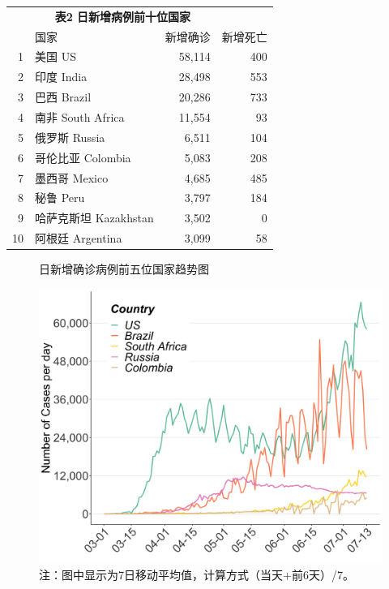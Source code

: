 \documentclass[]{article}
\begin{document}
\begin{table}[H]
    \centering \begin{table}[H]
\centering\begingroup\fontsize{20}{22}\selectfont

\begin{tabular}{rlrr}
\toprule
\multicolumn{0}{c}{\textbf{ }} & \multicolumn{2}{c}{\textbf{表2 日新增病例前十位国家}} \\
  & 国家 & 新增确诊 & 新增死亡\\
\midrule
\rowcolor{gray!6}  1 & 美国 US & 58,114 & 400\\
2 & 印度 India & 28,498 & 553\\
\rowcolor{gray!6}  3 & 巴西 Brazil & 20,286 & 733\\
4 & 南非 South Africa & 11,554 & 93\\
\rowcolor{gray!6}  5 & 俄罗斯 Russia & 6,511 & 104\\
6 & 哥伦比亚 Colombia & 5,083 & 208\\
\rowcolor{gray!6}  7 & 墨西哥 Mexico & 4,685 & 485\\
8 & 秘鲁 Peru & 3,797 & 184\\
\rowcolor{gray!6}  9 & 哈萨克斯坦 Kazakhstan & 3,502 & 0\\
10 & 阿根廷 Argentina & 3,099 & 58\\
\bottomrule
\end{tabular}
\endgroup{}
\end{table} \end{table}
\vspace{5mm}
\begin{minipage}{\textwidth}
  \begin{figure}[H]
  \centering
  \caption{日新增确诊病例前五位国家趋势图}
  \includegraphics[]{./input/covid2.png}
  \captionsetup{font=large}\caption*{注：图中显示为7日移动平均值，计算方式（当天+前6天）/7。}
  \end{figure}
\end{minipage}
\end{document}
